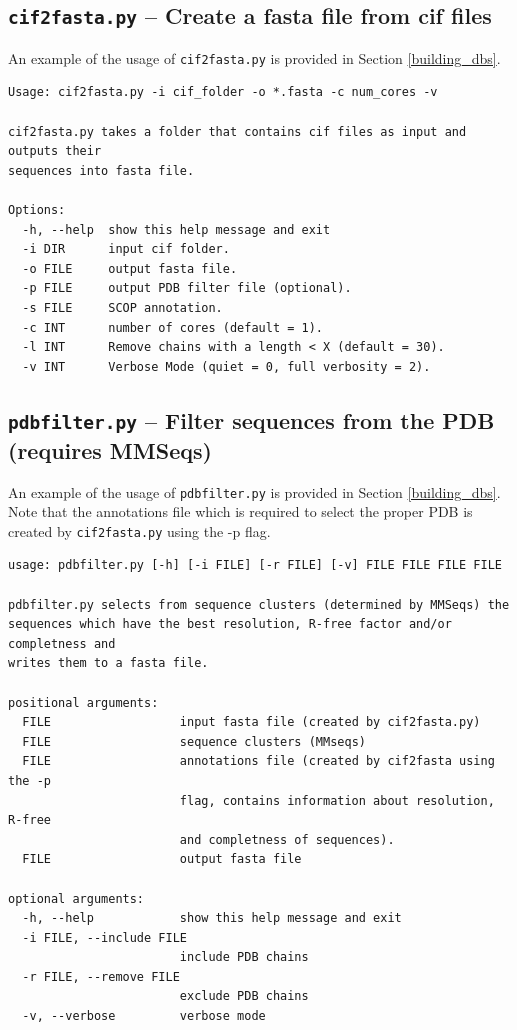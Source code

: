 \documentclass[11pt,a4paper]{article}
\begin{document}
\subsection{{\tt cif2fasta.py} -- Create a fasta file from cif files}

An example of the usage of \verb`cif2fasta.py` is provided in Section \ref{building_dbs}. 

\small 
\begin{verbatim}
Usage: cif2fasta.py -i cif_folder -o *.fasta -c num_cores -v

cif2fasta.py takes a folder that contains cif files as input and outputs their
sequences into fasta file.

Options:
  -h, --help  show this help message and exit
  -i DIR      input cif folder.
  -o FILE     output fasta file.
  -p FILE     output PDB filter file (optional).
  -s FILE     SCOP annotation.
  -c INT      number of cores (default = 1).
  -l INT      Remove chains with a length < X (default = 30).
  -v INT      Verbose Mode (quiet = 0, full verbosity = 2).
\end{verbatim} 
\normalsize

\subsection{{\tt pdbfilter.py} -- Filter sequences from the PDB (requires MMSeqs)}

An example of the usage of \verb`pdbfilter.py` is provided in Section \ref{building_dbs}. Note that the annotations file which is required to select the proper PDB is created by \verb`cif2fasta.py` using the -p flag.

\small 
\begin{verbatim}
usage: pdbfilter.py [-h] [-i FILE] [-r FILE] [-v] FILE FILE FILE FILE

pdbfilter.py selects from sequence clusters (determined by MMSeqs) the
sequences which have the best resolution, R-free factor and/or completness and
writes them to a fasta file.

positional arguments:
  FILE                  input fasta file (created by cif2fasta.py)
  FILE                  sequence clusters (MMseqs)
  FILE                  annotations file (created by cif2fasta using the -p
                        flag, contains information about resolution, R-free
                        and completness of sequences).
  FILE                  output fasta file

optional arguments:
  -h, --help            show this help message and exit
  -i FILE, --include FILE
                        include PDB chains
  -r FILE, --remove FILE
                        exclude PDB chains
  -v, --verbose         verbose mode
\end{verbatim} 
\normalsize
\end{document}
